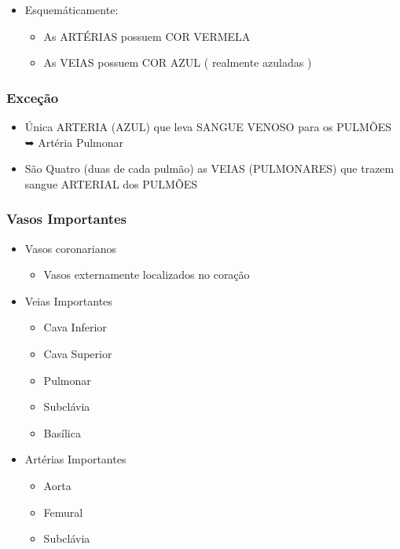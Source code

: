 \documentclass[
]{book}
\providecommand{\tightlist}{%
  \setlength{\itemsep}{0pt}\setlength{\parskip}{0pt}}
\begin{document}
\begin{itemize}
\tightlist
\item
  Esquemáticamente:

  \begin{itemize}
  \tightlist
  \item
    As ARTÉRIAS possuem COR VERMELA
  \item
    As VEIAS possuem COR AZUL ( realmente azuladas )
  \end{itemize}
\end{itemize}

\hypertarget{exceuxe7uxe3o}{%
\subsubsection{Exceção}\label{exceuxe7uxe3o}}

\begin{itemize}
\tightlist
\item
  Única ARTERIA (AZUL) que leva SANGUE VENOSO para os PULMÕES ➥ Artéria Pulmonar
\item
  São Quatro (duas de cada pulmão) as VEIAS (PULMONARES) que trazem sangue ARTERIAL dos PULMÕES
\end{itemize}

\hypertarget{vasos-importantes}{%
\subsubsection{Vasos Importantes}\label{vasos-importantes}}

\begin{itemize}
\tightlist
\item
  Vasos coronarianos

  \begin{itemize}
  \tightlist
  \item
    Vasos externamente localizados no coração
  \end{itemize}
\item
  Veias Importantes

  \begin{itemize}
  \tightlist
  \item
    Cava Inferior
  \item
    Cava Superior
  \item
    Pulmonar
  \item
    Subclávia
  \item
    Basílica
  \end{itemize}
\item
  Artérias Importantes

  \begin{itemize}
  \tightlist
  \item
    Aorta
  \item
    Femural
  \item
    Subclávia
  \end{itemize}
\end{itemize}
\end{document}
